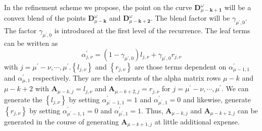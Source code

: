 \documentclass[acmtog]{acmart}
\begin{document}
In the refinement scheme we propose, the point on the curve $\mathbf{D}_{\mu-\mathbf{k}+\mathbf{1}}^\omega$ will be a convex blend of the points $\mathbf{D}_{\mu-\mathbf{k}}^\omega$ and $\mathbf{D}_{\mu-\mathbf{k}+\mathbf{2}}^\omega$. The blend factor will be $\gamma_{\mu^{\prime}, 0}$. The factor $\gamma_{\mu^{\prime}, 0}$ is introduced at the first level of the recurrence. The leaf terms can be written as
$$
\alpha_{j, \nu}^{\prime}=\left(1-\gamma_{\mu^{\prime}, 0}\right) l_{j, \nu}+\gamma_{\mu^{\prime}, 0} r_{j, \nu}
$$
with $j=\mu^{\prime}-\nu, \cdots, \mu^{\prime} .\left\{l_{j, \nu}\right\}$ and $\left\{r_{j, \nu}\right\}$ are those terms dependent on $\alpha_{\mu-1,1}^{\prime}$ and $\alpha_{\mu, 1}^{\prime}$ respectively. They are the elements of the alpha matrix rows $\mu-k$ and $\mu-k+2$ with $\mathbf{A}_{\mu-k, j}=l_{j, \nu}$ and $\mathbf{A}_{\mu-k+2, j}=r_{j, \nu}$ for $j=\mu^{\prime}-\nu, \cdots, \mu^{\prime}$. We can generate the $\left\{l_{j, \nu}\right\}$ by setting $\alpha_{\mu^{\prime}-1,1}^{\prime}=1$ and $\alpha_{\mu^{\prime}, 1}^{\prime}=0$ and likewise, generate $\left\{r_{j, \nu}\right\}$ by setting $\alpha_{\mu^{\prime}-1,1}^{\prime}=0$ and $\alpha_{\mu^{\prime}, 1}^{\prime}=1$. Thus, $\mathbf{A}_{\mu-k, j}$ and $\mathbf{A}_{\mu-k+2, j}$ can be generated in the course of generating $\mathbf{A}_{\mu-k+1, j}$ at little additional expense.
\end{document}
